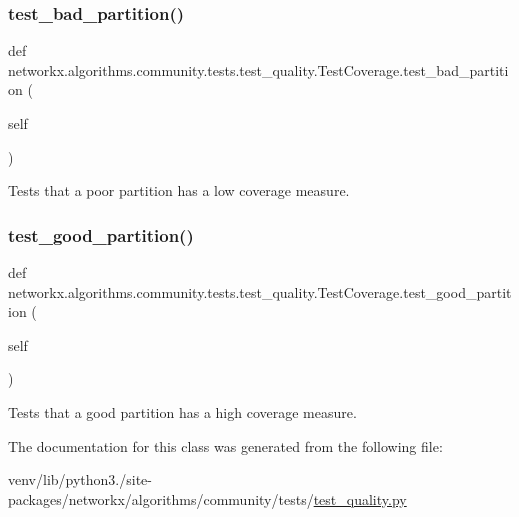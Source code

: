 \subsubsection{\texorpdfstring{test\+\_\+bad\+\_\+partition()}{test\_bad\_partition()}}
{\footnotesize\ttfamily def networkx.\+algorithms.\+community.\+tests.\+test\+\_\+quality.\+Test\+Coverage.\+test\+\_\+bad\+\_\+partition (\begin{DoxyParamCaption}\item[{}]{self }\end{DoxyParamCaption})}

\begin{DoxyVerb}Tests that a poor partition has a low coverage measure.\end{DoxyVerb}
 \mbox{\label{classnetworkx_1_1algorithms_1_1community_1_1tests_1_1test__quality_1_1TestCoverage_a8403f26c715e79f382e825928479e507}} 
\subsubsection{\texorpdfstring{test\+\_\+good\+\_\+partition()}{test\_good\_partition()}}
{\footnotesize\ttfamily def networkx.\+algorithms.\+community.\+tests.\+test\+\_\+quality.\+Test\+Coverage.\+test\+\_\+good\+\_\+partition (\begin{DoxyParamCaption}\item[{}]{self }\end{DoxyParamCaption})}

\begin{DoxyVerb}Tests that a good partition has a high coverage measure.\end{DoxyVerb}
 

The documentation for this class was generated from the following file\+:\begin{DoxyCompactItemize}
\item 
venv/lib/python3./site-\/packages/networkx/algorithms/community/tests/\hyperlink{test__quality_8py}{test\+\_\+quality.\+py}\end{DoxyCompactItemize}
